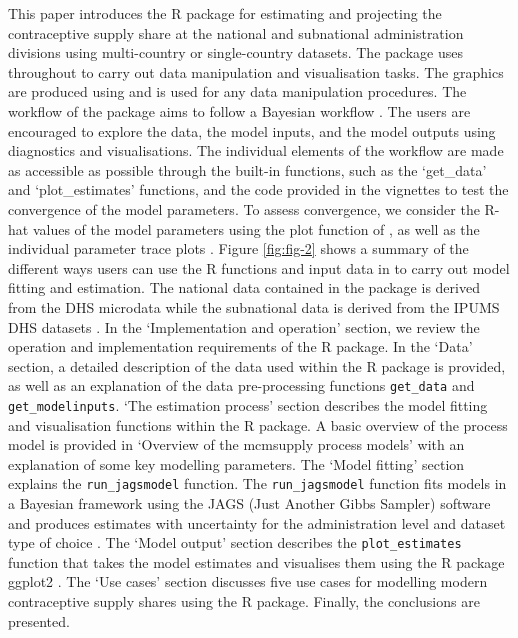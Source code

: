 This paper introduces the R package  for estimating and projecting the contraceptive supply share at the national and subnational administration divisions using multi-country or single-country datasets. The package uses  throughout to carry out data manipulation and visualisation tasks. The graphics are produced using  and  is used for any data manipulation procedures. The workflow of the package aims to follow a Bayesian workflow \citep{Gelman2020}. The users are encouraged to explore the data, the model inputs, and the model outputs using diagnostics and visualisations. The individual elements of the workflow are made as accessible as possible through the built-in functions, such as the `get\_data' and `plot\_estimates' functions, and the code provided in the vignettes to test the convergence of the model parameters. To assess convergence, we consider the R-hat values of the model parameters using the plot function of , as well as the individual parameter trace plots \citep{Vehtari2021}. Figure \ref{fig:fig-2} shows a summary of the different ways users can use the R functions and input data in  to carry out model fitting and estimation. The national data contained in the package is derived from the DHS microdata \citep{ICF2004} while the subnational data is derived from the IPUMS DHS datasets \citep{Heger2022}. In the `Implementation and operation' section, we review the operation and implementation requirements of the  R package. In the `Data' section, a detailed description of the data used within the  R package is provided, as well as an explanation of the data pre-processing functions \texttt{get\_data} and \texttt{get\_modelinputs}. `The estimation process' section describes the model fitting and visualisation functions within the  R package. A basic overview of the process model is provided in `Overview of the mcmsupply process models' with an explanation of some key modelling parameters. The `Model fitting' section explains the \texttt{run\_jagsmodel} function. The \texttt{run\_jagsmodel} function fits models in a Bayesian framework using the JAGS (Just Another Gibbs Sampler) software and produces estimates with uncertainty for the administration level and dataset type of choice \citep{Hornik2003}. The `Model output' section describes the \texttt{plot\_estimates} function that takes the model estimates and visualises them using the R package ggplot2 \citep{Wickham2016}. The `Use cases' section discusses five use cases for modelling modern contraceptive supply shares using the  R package. Finally, the conclusions are presented.

